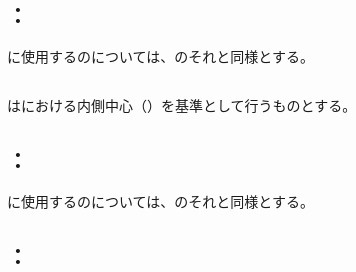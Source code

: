 \subsection{\indexTCOutcutMilling\nameToolCorrection：\EndFaceBoringMilling}
\EndFaceBoringMilling に使用する\indexTCSquareEndMill\nameSquareEndMill の\ToolCorrection については、\OutcutMilling のそれと同様とする。



\subsection{\IncutBoringMillingReferencePoint}
\IncutBoringMillingReferencePoint は\TopEndFace における内側中心（\nameTopEndFace）を基準として行うものとする。


\subsection{\indexTCOutcutMilling\nameToolCorrection：\IncutBoringMilling}
\IncutBoringMilling に使用する\indexTCSquareEndMill\nameSquareEndMill の\ToolCorrection については、\OutcutMilling のそれと同様とする。


\clearpage


\subsection{\indexTCDimpleMilling\nameToolCorrection：\nameDimpleMilling}

